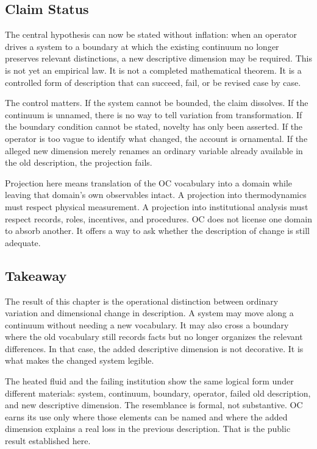 \documentclass[11pt,a4paper,openany]{book}
\begin{document}
\subsection{Claim Status}
The central hypothesis can now be stated without inflation: when an operator drives a system to a boundary at which the existing continuum no longer preserves relevant distinctions, a new descriptive dimension may be required. This is not yet an empirical law. It is not a completed mathematical theorem. It is a controlled form of description that can succeed, fail, or be revised case by case. \cite{landau_stat_physics,prigogine_dissipative}\par
The control matters. If the system cannot be bounded, the claim dissolves. If the continuum is unnamed, there is no way to tell variation from transformation. If the boundary condition cannot be stated, novelty has only been asserted. If the operator is too vague to identify what changed, the account is ornamental. If the alleged new dimension merely renames an ordinary variable already available in the old description, the projection fails.\par
Projection here means translation of the OC vocabulary into a domain while leaving that domain's own observables intact. A projection into thermodynamics must respect physical measurement. A projection into institutional analysis must respect records, roles, incentives, and procedures. OC does not license one domain to absorb another. It offers a way to ask whether the description of change is still adequate.\par
\subsection{Takeaway}
The result of this chapter is the operational distinction between ordinary variation and dimensional change in description. A system may move along a continuum without needing a new vocabulary. It may also cross a boundary where the old vocabulary still records facts but no longer organizes the relevant differences. In that case, the added descriptive dimension is not decorative. It is what makes the changed system legible. \cite{landau_stat_physics,prigogine_dissipative}\par
The heated fluid and the failing institution show the same logical form under different materials: system, continuum, boundary, operator, failed old description, and new descriptive dimension. The resemblance is formal, not substantive. OC earns its use only where those elements can be named and where the added dimension explains a real loss in the previous description. That is the public result established here.\par
\end{document}

